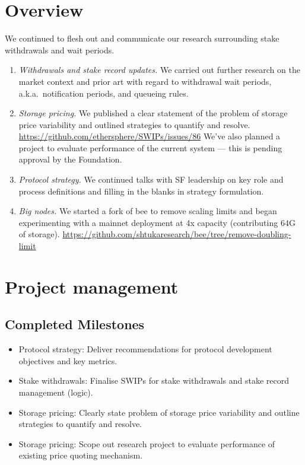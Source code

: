 \maketitle
\section*{Overview}

We continued to flesh out and communicate our research surrounding stake withdrawals and wait periods.

\begin{enumerate}
  \item \emph{Withdrawals and stake record updates.} 
    We carried out further research on the market context and prior art with regard to withdrawal wait periods, a.k.a.~notification periods, and queueing rules.

  \item \emph{Storage pricing.}
    We published a clear statement of the problem of storage price variability and outlined strategies to quantify and resolve.
    \url{https://github.com/ethersphere/SWIPs/issues/86}
    We've also planned a project to evaluate performance of the current system — this is pending approval by the Foundation.

  \item \emph{Protocol strategy.}
    We continued talks with SF leadership on key role and process definitions and filling in the blanks in strategy formulation.

  \item \emph{Big nodes.}
    We started a fork of bee to remove scaling limits and began experimenting with a mainnet deployment at 4x capacity (contributing 64G of storage).
    \url{https://github.com/shtukaresearch/bee/tree/remove-doubling-limit}

\end{enumerate}

\section*{Project management}

\subsection*{Completed Milestones}

\begin{itemize}
  \item Protocol strategy: Deliver recommendations for protocol development objectives and key metrics.
  \item Stake withdrawals: Finalise SWIPs for stake withdrawals and stake record management (logic).
  \item Storage pricing: Clearly state problem of storage price variability and outline strategies to quantify and resolve.
  \item Storage pricing: Scope out research project to evaluate performance of existing price quoting mechanism.
\end{itemize}

